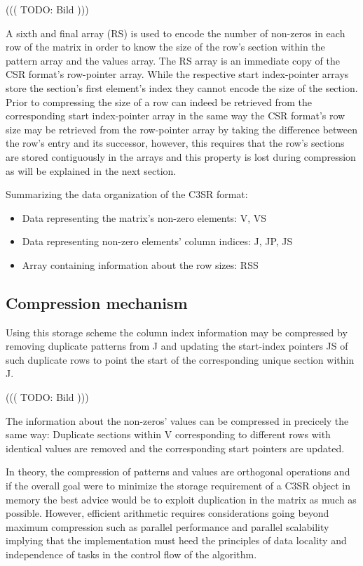 \documentclass{article}
\begin{document}
      ((( TODO: Bild )))

    A sixth and final array (RS) is used to encode the number of non-zeros in each row of the matrix in order to know the size of the row's section within the pattern array and the values array. The RS array is an immediate copy of the CSR format's row-pointer array.  While the respective start index-pointer arrays store the section's first element's index they cannot encode the size of the section. Prior to compressing the size of a row can indeed be retrieved from the corresponding start index-pointer array in the same way the CSR format's row size may be retrieved from the row-pointer array by taking the difference between the row's entry and its successor, however, this requires that the row's sections are stored contiguously in the arrays and this property is lost during compression as will be explained in the next section.

    Summarizing the data organization of the C3SR format:
    \begin{itemize}
      \item Data representing the matrix's non-zero elements: V, VS
      \item Data representing non-zero elements' column indices: J, JP, JS
      \item Array containing information about the row sizes: RSS
    \end{itemize}

  \subsection{Compression mechanism}

    Using this storage scheme the column index information may be compressed by removing duplicate patterns from J and
    updating the start-index pointers JS of such duplicate rows to point the start of the corresponding unique section
    within J.

      ((( TODO: Bild )))

    The information about the non-zeros' values can be compressed in precicely the same way: Duplicate sections within V
    corresponding to different rows with identical values are removed and the corresponding start pointers are updated.

    In theory, the compression of patterns and values are orthogonal operations and if the overall goal were to minimize
    the storage requirement of a C3SR object in memory the best advice would be to exploit duplication in the matrix as
    much as possible. However, efficient arithmetic requires considerations going beyond maximum compression such as
    parallel performance and parallel scalability implying that the implementation must heed the principles of
    data locality and independence of tasks in the control flow of the algorithm.
\end{document}
